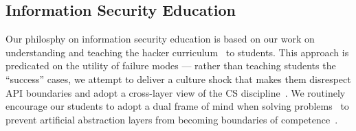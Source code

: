 \subsection{Information Security Education}

Our philosphy on information security education is based on our work
on understanding and teaching the hacker
curriculum~\cite{bratus2007hacklearn} to students.  This approach is
predicated on the utility of failure modes --- rather than teaching
students the ``success'' cases, we attempt to deliver a culture shock
that makes them disrespect API boundaries and adopt a cross-layer view
of the CS discipline~\cite{bratus2010sigcse}.  We routinely encourage
our students to adopt a dual frame of mind when solving
problems~\cite{locasto2009own} to prevent artificial abstraction
layers from becoming boundaries of competence~\cite{white1996csedsec}.







